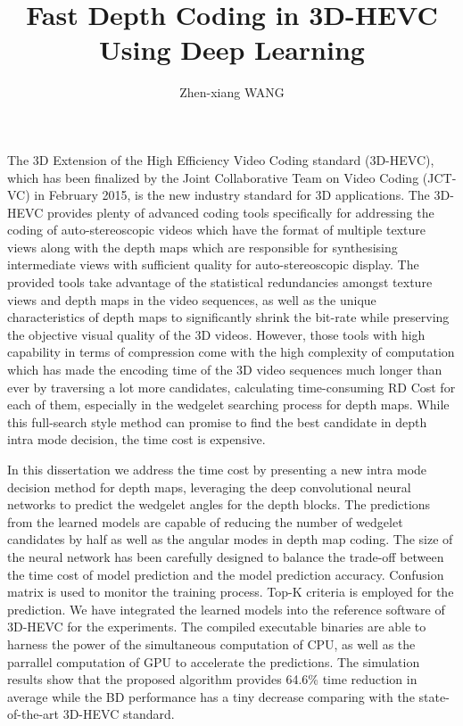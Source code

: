 \documentclass{report}
\begin{document}
    \title{Fast Depth Coding in 3D-HEVC
    Using Deep Learning}
    \author{Zhen-xiang WANG}
    \beforepreface
    The 3D Extension of the High Efficiency Video Coding standard (3D-HEVC),
    which has been finalized by the Joint Collaborative Team on Video Coding
    (JCT-VC) in February 2015, is the new industry standard for 3D applications.
    The 3D-HEVC provides plenty of advanced coding tools specifically
    for addressing the coding of auto-stereoscopic videos which have the format
    of multiple texture views along with the depth maps which are responsible
    for synthesising intermediate views with sufficient quality for
    auto-stereoscopic display.
    The provided tools take advantage of the statistical redundancies amongst
    texture views and depth maps in the video sequences, as well as the unique
    characteristics of depth maps to significantly shrink the bit-rate
    while preserving the objective visual quality of the
    3D videos.
    However, those tools with high capability in terms of compression come
    with the high complexity of computation which has made the encoding time
    of the 3D video sequences much longer than ever by traversing a lot more
    candidates, calculating time-consuming RD Cost for each of them,
    especially in the wedgelet searching process for depth maps.
    While this full-search style method can promise to find the best
    candidate in depth intra mode decision, the time cost is expensive.

    In this dissertation we address the time cost by presenting a new
    intra mode decision method for depth maps, leveraging the deep
    convolutional neural networks to predict the wedgelet angles
    for the depth blocks.
    The predictions from the learned models are capable of
    reducing the number of wedgelet candidates by half as well as the
    angular modes in depth map coding.
    The size of the neural network has been carefully designed to balance
    the trade-off between the time cost of model prediction and the model prediction
    accuracy.
    Confusion matrix is used to monitor the training process.
    Top-K criteria is employed for the prediction.
    We have integrated the learned models into the reference software of
    3D-HEVC for the experiments.
    The compiled executable binaries are able to harness
    the power of the simultaneous computation of CPU, as well as
    the parrallel computation of GPU to accelerate the predictions.
    The simulation results show that the proposed algorithm
    provides 64.6\% time reduction in average while the
    BD performance has a tiny decrease comparing with the state-of-the-art 3D-HEVC
    standard.
\end{document}

